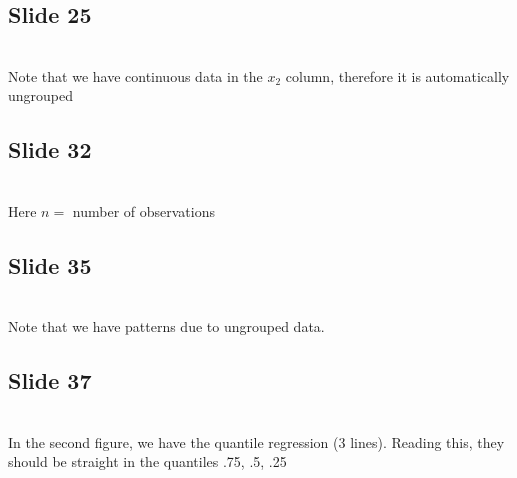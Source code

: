 \subsection{Slide 25}\hfill\\
\noindent Note that we have continuous data in the $x_2$ column, therefore it is automatically ungrouped
\par\bigskip
\subsection{Slide 32}\hfill\\
\noindent Here $n = $ number of observations
\par\bigskip
\subsection{Slide 35}\hfill\\
\noindent Note that we have patterns due to ungrouped data.
\par\bigskip
\subsection{Slide 37}\hfill\\
\noindent In the second figure, we have the quantile regression (3 lines). Reading this, they should be straight in the quantiles .75, .5, .25 
